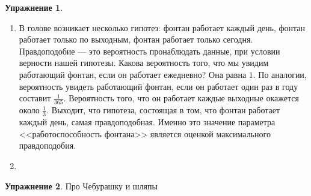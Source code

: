 \documentclass[12pt, a4paper, oneside]{extreport}
\theoremstyle{plain}              %
\theoremstyle{definition}         %
\newtheorem{problem}{\color{myblue} Упражнение}
\begin{document}
\begin{problem}
\begin{enumerate}
\end{enumerate}
	
\begin{sol}
\begin{enumerate}	
	\item В голове возникает несколько гипотез: фонтан работает каждый день, фонтан работает только по выходным, фонтан работает только сегодня. Правдоподобие --- это вероятность пронаблюдать данные, при условии верности нашей гипотезы. Какова вероятность того, что мы увидим работающий фонтан, если он работает ежедневно?  Она равна $1$. По аналогии, вероятность увидеть работающий фонтан, если он работает один раз в году составит $\frac{1}{365}$. Вероятность того, что он работает каждые выходные окажется около $\frac{1}{3}$. Выходит, что гипотеза, состоящая в том, что фонтан работает каждый день, самая правдоподобная. Именно это значение параметра <<работоспособность фонтана>> является оценкой максимального правдоподобия. 
	
	\item 
	

\end{enumerate}	
\end{sol}
\end{problem}



\begin{problem} 
	Про Чебурашку и шляпы 


	\begin{sol}

	\end{sol}
\end{problem}
\end{document}
